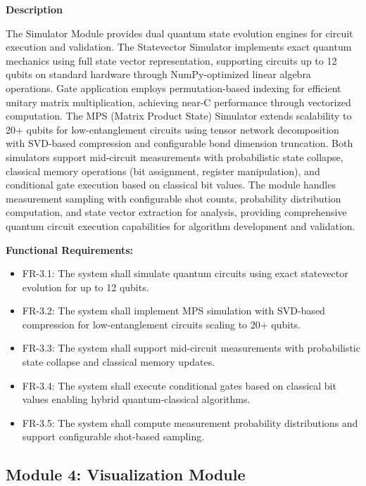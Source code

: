 \textbf{Description}

The Simulator Module provides dual quantum state evolution engines for circuit execution and validation. The Statevector Simulator implements exact quantum mechanics using full state vector representation, supporting circuits up to 12 qubits on standard hardware through NumPy-optimized linear algebra operations. Gate application employs permutation-based indexing for efficient unitary matrix multiplication, achieving near-C performance through vectorized computation. The MPS (Matrix Product State) Simulator extends scalability to 20+ qubits for low-entanglement circuits using tensor network decomposition with SVD-based compression and configurable bond dimension truncation. Both simulators support mid-circuit measurements with probabilistic state collapse, classical memory operations (bit assignment, register manipulation), and conditional gate execution based on classical bit values. The module handles measurement sampling with configurable shot counts, probability distribution computation, and state vector extraction for analysis, providing comprehensive quantum circuit execution capabilities for algorithm development and validation.

\textbf{Functional Requirements:}

\begin{itemize}
    \item FR-3.1: The system shall simulate quantum circuits using exact statevector evolution for up to 12 qubits.
    \item FR-3.2: The system shall implement MPS simulation with SVD-based compression for low-entanglement circuits scaling to 20+ qubits.
    \item FR-3.3: The system shall support mid-circuit measurements with probabilistic state collapse and classical memory updates.
    \item FR-3.4: The system shall execute conditional gates based on classical bit values enabling hybrid quantum-classical algorithms.
    \item FR-3.5: The system shall compute measurement probability distributions and support configurable shot-based sampling.
\end{itemize}



\subsection{Module 4: Visualization Module}


